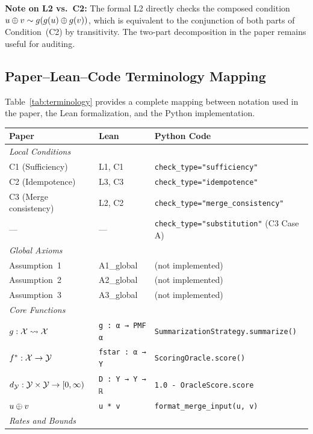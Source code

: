 \noindent\textbf{Note on L2 vs.\ C2:} The formal L2 directly checks the composed condition $u\oplus v \sim g(g(u)\oplus g(v))$, which is equivalent to the conjunction of both parts of Condition~(C2) by transitivity. The two-part decomposition in the paper remains useful for auditing.

\subsection{Paper--Lean--Code Terminology Mapping}

Table~\ref{tab:terminology} provides a complete mapping between notation used in the paper, the Lean formalization, and the Python implementation.

\begin{table}[h]
\centering
\small
\begin{tabular}{lll}
\toprule
Paper & Lean & Python Code \\
\midrule
\multicolumn{3}{l}{\emph{Local Conditions}} \\
C1 (Sufficiency) & L1, C1 & \texttt{check\_type="sufficiency"} \\
C2 (Idempotence) & L3, C3 & \texttt{check\_type="idempotence"} \\
C3 (Merge consistency) & L2, C2 & \texttt{check\_type="merge\_consistency"} \\
--- & --- & \texttt{check\_type="substitution"} (C3 Case A) \\
\midrule
\multicolumn{3}{l}{\emph{Global Axioms}} \\
Assumption~1 & A1\_global & (not implemented) \\
Assumption~2 & A2\_global & (not implemented) \\
Assumption~3 & A3\_global & (not implemented) \\
\midrule
\multicolumn{3}{l}{\emph{Core Functions}} \\
$g : \mathcal{X} \rightsquigarrow \mathcal{X}$ & \texttt{g : α → PMF α} & \texttt{SummarizationStrategy.summarize()} \\
$f^{\ast} : \mathcal{X} \to \mathcal{Y}$ & \texttt{fstar : α → Y} & \texttt{ScoringOracle.score()} \\
$d_{\mathcal{Y}} : \mathcal{Y} \times \mathcal{Y} \to [0,\infty)$ & \texttt{D : Y → Y → ℝ} & \texttt{1.0 - OracleScore.score} \\
$u \oplus v$ & \texttt{u * v} & \texttt{format\_merge\_input(u, v)} \\
\midrule
\multicolumn{3}{l}{\emph{Rates and Bounds}} \\

\end{tabular}
\end{table}
